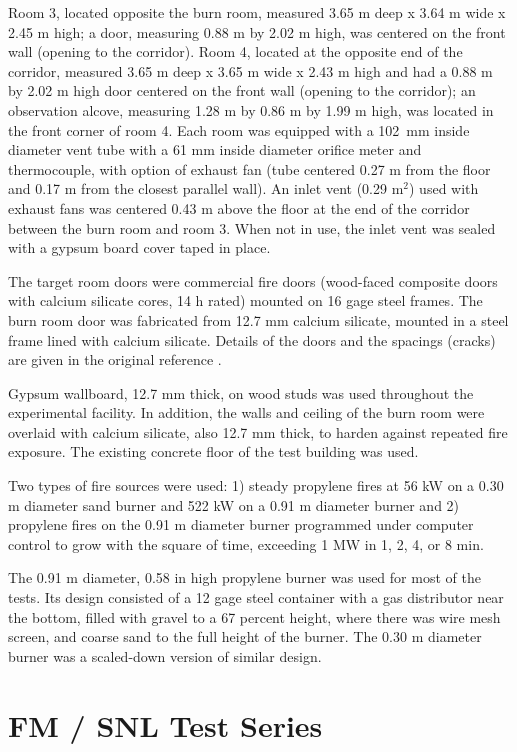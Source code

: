 Room 3, located opposite the burn room, measured 3.65 m deep x 3.64 m wide x 2.45 m high; a door, measuring 0.88 m by 2.02 m high, was centered on the front wall (opening to the corridor). Room 4, located at the opposite end of the corridor, measured 3.65 m deep x 3.65 m wide x 2.43 m high and had a 0.88 m by 2.02 m high door centered on the front wall (opening to the corridor); an observation alcove, measuring 1.28 m by 0.86 m by 1.99 m high, was located in the front corner of room 4. Each room was equipped with a 102~mm inside diameter vent tube with a 61 mm inside diameter orifice meter and thermocouple, with option of exhaust fan (tube centered 0.27 m from the floor and 0.17 m from the closest parallel wall). An inlet vent (0.29 m$^2$) used with exhaust fans was centered 0.43 m above the floor at the end of the corridor between the burn room and room 3. When not in use, the inlet vent was sealed with a gypsum board cover taped in place.

The target room doors were commercial fire doors (wood-faced composite doors with calcium silicate cores, 14 h rated) mounted on 16 gage steel frames. The burn room door was fabricated from 12.7 mm calcium silicate, mounted in a steel frame lined with calcium silicate. Details of the doors and the spacings (cracks) are given in the original reference \cite{Heskestad:1986}. 

Gypsum wallboard, 12.7 mm thick, on wood studs was used throughout the experimental facility. In addition, the walls and ceiling of the burn room were overlaid with calcium silicate, also 12.7 mm thick, to harden against repeated fire exposure. The existing concrete floor of the test building was used.

Two types of fire sources were used: 1) steady propylene fires at 56 kW on a 0.30 m diameter sand burner and 522 kW on a 0.91 m diameter burner and 2) propylene fires on the 0.91 m diameter burner programmed under computer control to grow with the square of time, exceeding 1 MW in 1, 2, 4, or 8 min.

The 0.91 m diameter, 0.58 in high propylene burner was used for most of the tests. Its design consisted of a 12 gage steel container with a gas distributor near the bottom, filled with gravel to a 67 percent height, where there was wire mesh screen, and coarse sand to the full height of the burner. The 0.30 m diameter burner was a scaled-down version of similar design.

\section{FM / SNL Test Series}

